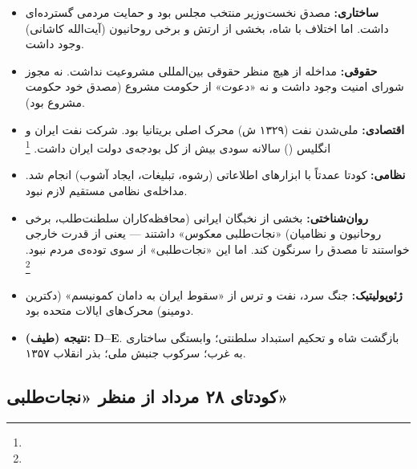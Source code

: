 \begin{tcolorbox}[casebox, title={تحلیل شش‌وجهی: کودتای ۲۸ مرداد ۱۳۳۲}]
\begin{itemize}[nosep, rightmargin=1em]
  \item \textbf{ساختاری:} مصدق نخست‌وزیر منتخب مجلس بود و حمایت مردمی گسترده‌ای داشت. اما اختلاف با شاه، بخشی از ارتش و برخی روحانیون (آیت‌الله کاشانی) وجود داشت.

  \item \textbf{حقوقی:} مداخله از هیچ منظر حقوقی بین‌المللی مشروعیت نداشت. نه مجوز شورای امنیت وجود داشت و نه «دعوت» از حکومت مشروع (مصدق خود حکومت مشروع بود).

  \item \textbf{اقتصادی:} ملی‌شدن نفت (۱۳۲۹ ش) محرک اصلی بریتانیا بود. شرکت نفت ایران و انگلیس () سالانه سودی بیش از کل بودجه‌ی دولت ایران داشت.%
  \footnote{}

  \item \textbf{نظامی:} کودتا عمدتاً با ابزارهای اطلاعاتی (رشوه، تبلیغات، ایجاد آشوب) انجام شد. مداخله‌ی نظامی مستقیم لازم نبود.

  \item \textbf{روان‌شناختی:} بخشی از نخبگان ایرانی (محافظه‌کاران سلطنت‌طلب، برخی روحانیون و نظامیان) «نجات‌طلبی معکوس» داشتند — یعنی از قدرت خارجی خواستند تا مصدق را سرنگون کند. اما این «نجات‌طلبی» از سوی توده‌ی مردم نبود.%
  \footnote{}

  \item \textbf{ژئوپولیتیک:} جنگ سرد، نفت و ترس از «سقوط ایران به دامان کمونیسم» (دکترین دومینو) محرک‌های ایالات متحده بود.

  \item \textbf{نتیجه (طیف):} \textbf{D–E}. بازگشت شاه و تحکیم استبداد سلطنتی؛ وابستگی ساختاری به غرب؛ سرکوب جنبش ملی؛ بذر انقلاب ۱۳۵۷.
\end{itemize}
\end{tcolorbox}

\subsection{کودتای ۲۸ مرداد از منظر «نجات‌طلبی»}
\label{subsec:ch07-coup-salvation}

